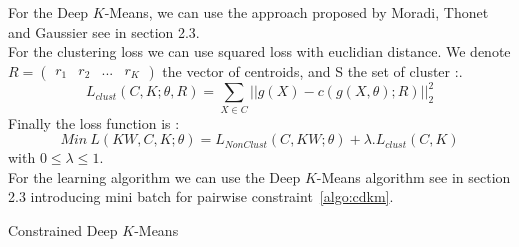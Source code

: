 For the Deep $K$-Means, we can use the approach proposed by Moradi, Thonet and Gaussier 
\cite{Deap-K-Means} see in section 2.3.\\
For the clustering loss we can use squared loss with euclidian distance. We
denote $R = \begin{pmatrix} r_1 & r_2 & ... & r_K\end{pmatrix}$ the vector of
centroids, and S the set of cluster :.  
\begin{equation}\label{eq:loss_clust}
  L_{clust}(C, K; \theta, R) = \sum_{X \in C} ||g(X) - c(g(X, \theta); R) ||_2^2 
\end{equation}
Finally the loss function is :
\begin{equation}\label{eq:loss_FINALE}
  Min~L(KW, C, K; \theta) = L_{NonClust}(C, KW; \theta) + \lambda.L_{clust}(C,K)
\end{equation}
with $0 \leq \lambda \leq 1$.\\
For the learning algorithm we can use the Deep $K$-Means algorithm see
in section 2.3 introducing mini batch for pairwise
constraint~\ref{algo:cdkm}.
\begin{algorithm}[!h]
  \caption{\label{algo:cdkm}Constrained Deep $K$-Means}
\end{algorithm}
